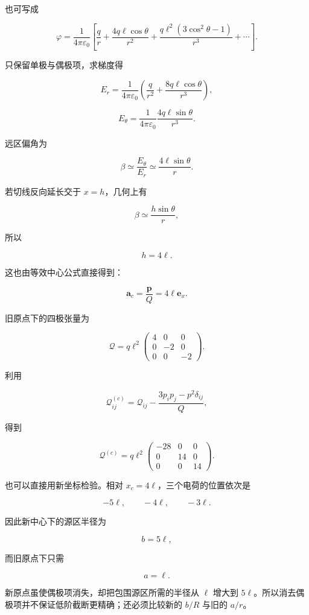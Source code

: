 也可写成

\[
\varphi
=\frac{1}{4\pi\varepsilon_0}
\left[
\frac qr
+\frac{4q\ell\cos\theta}{r^2}
+\frac{q\ell^2(3\cos^2\theta-1)}{r^3}
+\cdots
\right].
\]

只保留单极与偶极项，求梯度得

\[
\boxed{
E_r
=\frac{1}{4\pi\varepsilon_0}
\left(
\frac q{r^2}
+\frac{8q\ell\cos\theta}{r^3}
\right)
},
\]

\[
\boxed{
E_{\theta}
=\frac{1}{4\pi\varepsilon_0}
\frac{4q\ell\sin\theta}{r^3}
}.
\]

远区偏角为

\[
\beta\simeq\frac{E_{\theta}}{E_r}
\simeq\frac{4\ell\sin\theta}{r}.
\]

若切线反向延长交于 \(x=h\)，几何上有

\[
\beta\simeq\frac{h\sin\theta}{r},
\]

所以

\[
\boxed{h=4\ell}.
\]

这也由等效中心公式直接得到：

\[
\boxed{
\mathbf a_c=\frac{\mathbf p}{Q}=4\ell\mathbf e_x
}.
\]

旧原点下的四极张量为

\[
\mathcal Q
=q\ell^2
\begin{pmatrix}
4&0&0\\
0&-2&0\\
0&0&-2
\end{pmatrix}.
\]

利用

\[
\mathcal Q_{ij}^{(c)}
=\mathcal Q_{ij}
-\frac{3p_ip_j-p^2\delta_{ij}}{Q},
\]

得到

\[
\boxed{
\mathcal Q^{(c)}
=q\ell^2
\begin{pmatrix}
-28&0&0\\
0&14&0\\
0&0&14
\end{pmatrix}
}.
\]

也可以直接用新坐标检验。相对 \(x_c=4\ell\)，三个电荷的位置依次是

\[
-5\ell,
\qquad
-4\ell,
\qquad
-3\ell.
\]

因此新中心下的源区半径为

\[
b=5\ell,
\]

而旧原点下只需

\[
a=\ell.
\]

新原点虽使偶极项消失，却把包围源区所需的半径从 \(\ell\) 增大到
\(5\ell\)。所以消去偶极项并不保证低阶截断更精确；还必须比较新的 \(b/R\)
与旧的 \(a/r\)。

